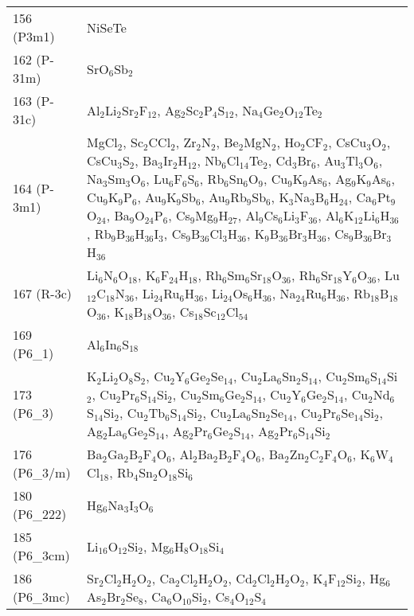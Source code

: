 {\begin{longtable}{p{7.315em}|p{40em}}
    156 (P3m1) & NiSeTe \\
    162 (P-31m) & SrO$_{6}$Sb$_{2}$ \\
    163 (P-31c) & Al$_{2}$Li$_{2}$Sr$_{2}$F$_{12}$, Ag$_{2}$Sc$_{2}$P$_{4}$S$_{12}$, Na$_{4}$Ge$_{2}$O$_{12}$Te$_{2}$ \\
    164 (P-3m1) & MgCl$_{2}$, Sc$_{2}$CCl$_{2}$, Zr$_{2}$N$_{2}$, Be$_{2}$MgN$_{2}$, Ho$_{2}$CF$_{2}$, CsCu$_{3}$O$_{2}$, CsCu$_{3}$S$_{2}$, Ba$_{3}$Ir$_{2}$H$_{12}$, Nb$_{6}$Cl$_{14}$Te$_{2}$, Cd$_{3}$Br$_{6}$, Au$_{3}$Tl$_{3}$O$_{6}$, Na$_{3}$Sm$_{3}$O$_{6}$, Lu$_{6}$F$_{6}$S$_{6}$, Rb$_{6}$Sn$_{6}$O$_{9}$, Cu$_{9}$K$_{9}$As$_{6}$, Ag$_{9}$K$_{9}$As$_{6}$, Cu$_{9}$K$_{9}$P$_{6}$, Au$_{9}$K$_{9}$Sb$_{6}$, Au$_{9}$Rb$_{9}$Sb$_{6}$, K$_{3}$Na$_{3}$B$_{6}$H$_{24}$, Ca$_{6}$Pt$_{9}$O$_{24}$, Ba$_{9}$O$_{24}$P$_{6}$, Cs$_{9}$Mg$_{9}$H$_{27}$, Al$_{9}$Cs$_{6}$Li$_{3}$F$_{36}$, Al$_{6}$K$_{12}$Li$_{6}$H$_{36}$, Rb$_{9}$B$_{36}$H$_{36}$I$_{3}$, Cs$_{9}$B$_{36}$Cl$_{3}$H$_{36}$, K$_{9}$B$_{36}$Br$_{3}$H$_{36}$, Cs$_{9}$B$_{36}$Br$_{3}$H$_{36}$ \\
    167 (R-3c) & Li$_{6}$N$_{6}$O$_{18}$, K$_{6}$F$_{24}$H$_{18}$, Rh$_{6}$Sm$_{6}$Sr$_{18}$O$_{36}$, Rh$_{6}$Sr$_{18}$Y$_{6}$O$_{36}$, Lu$_{12}$C$_{18}$N$_{36}$, Li$_{24}$Ru$_{6}$H$_{36}$, Li$_{24}$Os$_{6}$H$_{36}$, Na$_{24}$Ru$_{6}$H$_{36}$, Rb$_{18}$B$_{18}$O$_{36}$, K$_{18}$B$_{18}$O$_{36}$, Cs$_{18}$Sc$_{12}$Cl$_{54}$ \\
    169 (P6\_1) & Al$_{6}$In$_{6}$S$_{18}$ \\
    173 (P6\_3) & K$_{2}$Li$_{2}$O$_{8}$S$_{2}$, Cu$_{2}$Y$_{6}$Ge$_{2}$Se$_{14}$, Cu$_{2}$La$_{6}$Sn$_{2}$S$_{14}$, Cu$_{2}$Sm$_{6}$S$_{14}$Si$_{2}$, Cu$_{2}$Pr$_{6}$S$_{14}$Si$_{2}$, Cu$_{2}$Sm$_{6}$Ge$_{2}$S$_{14}$, Cu$_{2}$Y$_{6}$Ge$_{2}$S$_{14}$, Cu$_{2}$Nd$_{6}$S$_{14}$Si$_{2}$, Cu$_{2}$Tb$_{6}$S$_{14}$Si$_{2}$, Cu$_{2}$La$_{6}$Sn$_{2}$Se$_{14}$, Cu$_{2}$Pr$_{6}$Se$_{14}$Si$_{2}$, Ag$_{2}$La$_{6}$Ge$_{2}$S$_{14}$, Ag$_{2}$Pr$_{6}$Ge$_{2}$S$_{14}$, Ag$_{2}$Pr$_{6}$S$_{14}$Si$_{2}$ \\
    176 (P6\_3/m) & Ba$_{2}$Ga$_{2}$B$_{2}$F$_{4}$O$_{6}$, Al$_{2}$Ba$_{2}$B$_{2}$F$_{4}$O$_{6}$, Ba$_{2}$Zn$_{2}$C$_{2}$F$_{4}$O$_{6}$, K$_{6}$W$_{4}$Cl$_{18}$, Rb$_{4}$Sn$_{2}$O$_{18}$Si$_{6}$ \\
    180 (P6\_222) & Hg$_{6}$Na$_{3}$I$_{3}$O$_{6}$ \\
    185 (P6\_3cm) & Li$_{16}$O$_{12}$Si$_{2}$, Mg$_{6}$H$_{8}$O$_{18}$Si$_{4}$ \\
    186 (P6\_3mc) & Sr$_{2}$Cl$_{2}$H$_{2}$O$_{2}$, Ca$_{2}$Cl$_{2}$H$_{2}$O$_{2}$, Cd$_{2}$Cl$_{2}$H$_{2}$O$_{2}$, K$_{4}$F$_{12}$Si$_{2}$, Hg$_{6}$As$_{2}$Br$_{2}$Se$_{8}$, Ca$_{6}$O$_{10}$Si$_{2}$, Cs$_{4}$O$_{12}$S$_{4}$ \\

\end{longtable}}

